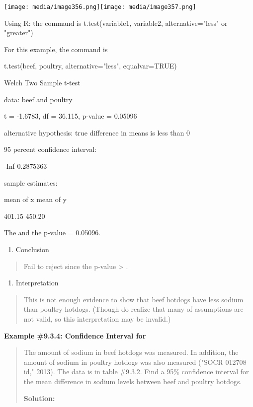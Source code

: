 \documentclass[]{book}
\providecommand{\tightlist}{%
  \setlength{\itemsep}{0pt}\setlength{\parskip}{0pt}}
\begin{document}
\texttt{[image: media/image356.png]}\texttt{[image: media/image357.png]}

Using R: the command is t.test(variable1, variable2,
alternative="less" or "greater")

For this example, the command is

t.test(beef, poultry, alternative="less", equalvar=TRUE)

Welch Two Sample t-test

data: beef and poultry

t = -1.6783, df = 36.115, p-value = 0.05096

alternative hypothesis: true difference in means is less than 0

95 percent confidence interval:

-Inf 0.2875363

sample estimates:

mean of x mean of y

401.15 450.20

The and the p-value = 0.05096.

\begin{enumerate}
\def\labelenumi{\arabic{enumi}.}
\setcounter{enumi}{4}
\tightlist
\item
  Conclusion
\end{enumerate}

\begin{quote}
Fail to reject since the p-value \textgreater{} .
\end{quote}

\begin{enumerate}
\def\labelenumi{\arabic{enumi}.}
\setcounter{enumi}{5}
\tightlist
\item
  Interpretation
\end{enumerate}

\begin{quote}
This is not enough evidence to show that beef hotdogs have less sodium
than poultry hotdogs. (Though do realize that many of assumptions are
not valid, so this interpretation may be invalid.)
\end{quote}

\textbf{Example \#9.3.4: Confidence Interval for }

\begin{quote}
The amount of sodium in beef hotdogs was measured. In addition, the
amount of sodium in poultry hotdogs was also measured ("SOCR 012708
id," 2013). The data is in table \#9.3.2. Find a 95\% confidence
interval for the mean difference in sodium levels between beef and
poultry hotdogs.

\textbf{Solution:}
\end{quote}
\end{document}

